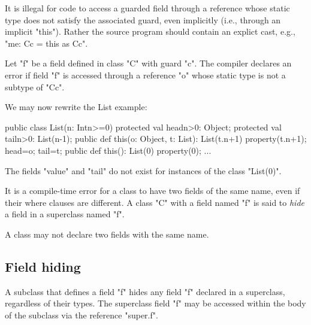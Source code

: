 It is illegal for code to access a guarded field through a reference
whose static type does not satisfy the associated guard, even
implicitly (i.e., through an implicit \xcd"this"). Rather the source
program should contain an explict cast, e.g., \xcd"me: C{c} = this as C{c}".

\begin{staticrule*}
Let \xcd"f" be a field defined in class
\xcd"C" with guard \xcd"c".  The compiler declares an error if
field \xcd"f" is accessed through a reference \xcd"o" whose static
type is not a subtype of \xcd"C{c}".
\end{staticrule*}

\begin{example}

We may now rewrite the List example:
\begin{xten}
public class List(n: Int{n>=0}) {
  protected val head{n>0}: Object;
  protected val tail{n>0}: List(n-1);
  public def this(o: Object, t: List): List(t.n+1) {
     property(t.n+1);
     head=o;
     tail=t;
  }
  public def this(): List(0) {
     property(0);
  }
  ...
}
\end{xten}

The fields \xcd"value" and \xcd"tail" do not exist for instances of the class
\xcd"List(0)".
\end{example}

It is a compile-time error for a class to have two fields of the same
name, even if their where clauses are different. A class \xcd"C" with a field
named \xcd"f" is said to {\em hide} a field in a superclass named \xcd"f".

\begin{staticrule*}
     A class may not declare two fields with the same name.
\end{staticrule*}

\subsection{Field hiding}

A subclass that defines a field \xcd"f" hides any field \xcd"f"
declared in a superclass, regardless of their types.  The
superclass field \xcd"f" may be accessed within the body of
the subclass via the reference \xcd"super.f".

